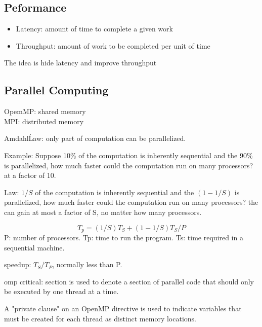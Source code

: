 \subsection{Peformance}
\begin{itemize}
  \item Latency: amount of time to complete a given work
  \item Throughput: amount of work to be completed per unit of time
\end{itemize}

The idea is hide latency and improve throughput

\subsection{Parallel Computing}
OpemMP: shared memory \\
MPI: distributed memory 

Amdahl\' Law: only part of computation can be parallelized.

Example: Suppose 10\% of the computation is inherently sequential and the 90\% is parallelized, how much faster could the computation run on many processors? at a factor of 10.

Law: $1/S$ of the computation is inherently sequential and the $(1-1/S)$ is parallelized, how much faster could the computation run on many processors? the can gain at most a factor of S, no matter how many processors.

\begin{equation}
T_p = (1/S)T_S + (1-1/S)T_S/P 
\end{equation}
P: number of processors. Tp: time to run the program. Ts: time required in a sequential machine.

speedup: $T_S/T_P$, normally less than P.

omp critical: section is used to denote a section of parallel code that should only be executed by one thread at a time. 

A "private clause" on an OpenMP directive is used to indicate variables that must be created for each thread as distinct memory locations.


